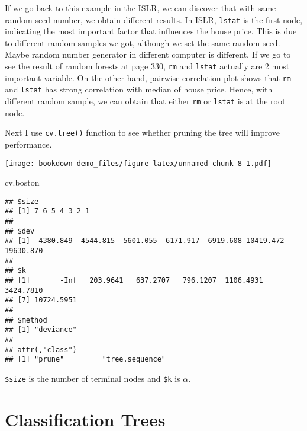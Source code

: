 \documentclass[]{book}
\newenvironment{Shaded}{\begin{snugshade}}{\end{snugshade}}
\newcommand{\DataTypeTok}[1]{\textcolor[rgb]{0.13,0.29,0.53}{#1}}
\newcommand{\KeywordTok}[1]{\textcolor[rgb]{0.13,0.29,0.53}{\textbf{#1}}}
\newcommand{\NormalTok}[1]{#1}
\newcommand{\OperatorTok}[1]{\textcolor[rgb]{0.81,0.36,0.00}{\textbf{#1}}}
\newcommand{\StringTok}[1]{\textcolor[rgb]{0.31,0.60,0.02}{#1}}
\begin{document}
If we go back to this example in the \href{http://faculty.marshall.usc.edu/gareth-james/ISL/}{ISLR}, we can discover that with same random seed number, we obtain different results. In \href{http://faculty.marshall.usc.edu/gareth-james/ISL/}{ISLR}, \texttt{lstat} is the first node, indicating the most important factor that influences the house price. This is due to different random samples we got, although we set the same random seed. Maybe random number generator in different computer is different. If we go to see the result of random forests at page 330, \texttt{rm} and \texttt{lstat} actually are 2 most important variable. On the other hand, pairwise correlation plot shows that \texttt{rm} and \texttt{lstat} has strong correlation with median of house price. Hence, with different random sample, we can obtain that either \texttt{rm} or \texttt{lstat} is at the root node.

Next I use \texttt{cv.tree()} function to see whether pruning the tree will improve performance.

\begin{Shaded}
\end{Shaded}

\texttt{[image: bookdown-demo\_files/figure-latex/unnamed-chunk-8-1.pdf]}

\begin{Shaded}
\begin{Highlighting}[]
\NormalTok{cv.boston}
\end{Highlighting}
\end{Shaded}

\begin{verbatim}
## $size
## [1] 7 6 5 4 3 2 1
## 
## $dev
## [1]  4380.849  4544.815  5601.055  6171.917  6919.608 10419.472 19630.870
## 
## $k
## [1]       -Inf   203.9641   637.2707   796.1207  1106.4931  3424.7810
## [7] 10724.5951
## 
## $method
## [1] "deviance"
## 
## attr(,"class")
## [1] "prune"         "tree.sequence"
\end{verbatim}

\texttt{\$size} is the number of terminal nodes and \texttt{\$k} is \(\alpha\).

\hypertarget{classification-trees}{%
\chapter{Classification Trees}\label{classification-trees}}


\end{document}
